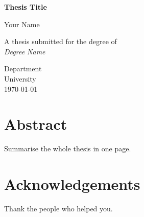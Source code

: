 \documentclass[12pt,a4paper,oneside]{report}
\begin{document}
\begin{titlepage}
  \centering
  \vspace*{3cm}
  {\LARGE\bfseries Thesis Title\par}
  \vspace{1.5cm}
  {\Large Your Name\par}
  \vspace{1cm}
  A thesis submitted for the degree of\\
  \textit{Degree Name}\par
  \vfill
  Department\\
  University\\[0.5cm]
  \today
\end{titlepage}

\chapter*{Abstract}
Summarise the whole thesis in one page.

\chapter*{Acknowledgements}
Thank the people who helped you.

\tableofcontents
\listoffigures
\listoftables

\clearpage
{}






\end{document}
